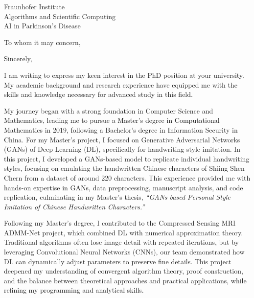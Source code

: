 \documentclass[11pt,a4paper, final]{moderncv}
\newcommand{\spacesubsection}{\vspace{0.2cm}}
\begin{document}
% 
\renewcommand{\refname}{\textbf{Publications}} 
{Fraunhofer Institute\\
Algorithms and Scientific Computing\\
AI in Parkinson's Disease}
\date{\today}
\opening{To whom it may concern,}
\closing{Sincerely,}
\makelettertitle
\thispagestyle{empty}
\pagestyle{empty}
I am writing to express my keen interest in the PhD position at your university. 
My academic background and research experience have equipped me with the skills and knowledge 
necessary for advanced study in this field. 

My journey began with a strong foundation in Computer Science and Mathematics, 
leading me to pursue a Master's degree in Computational Mathematics in 2019, 
following a Bachelor's degree in Information Security in China. 
For my Master's project, I focused on Generative Adversarial Networks (GANs) of Deep Learning (DL), 
specifically for handwriting style imitation. 
In this project, I developed a GANs-based model to replicate individual handwriting styles, 
focusing on emulating the handwritten Chinese characters of Shiing Shen Chern from a dataset of around 220 characters. 
This experience provided me with hands-on expertise in GANs, 
data preprocessing, manuscript analysis, and code replication, 
culminating in my Master's thesis, \emph{``GANs based Personal Style Imitation of Chinese Handwritten Characters.''}

Following my Master's degree, 
I contributed to the Compressed Sensing MRI ADMM-Net project, 
which combined DL with numerical approximation theory. 
Traditional algorithms often lose image detail with repeated iterations, 
but by leveraging Convolutional Neural Networks (CNNs), 
our team demonstrated how DL can dynamically adjust parameters to preserve fine details. 
This project deepened my understanding of convergent algorithm theory, proof construction, 
and the balance between theoretical approaches and practical applications, 
while refining my programming and analytical skills.
\end{document}
